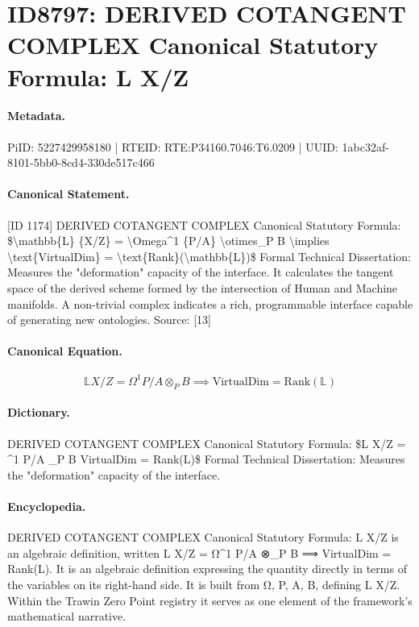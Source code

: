 \section*{ID8797: DERIVED COTANGENT COMPLEX Canonical Statutory Formula: L X/Z}
\paragraph{Metadata.}
PiID: 5227429958180 | RTEID: RTE:P34160.7046:T6.0209 | UUID: 1abc32af-8101-5bb0-8cd4-330de517c466

\paragraph{Canonical Statement.}
[ID 1174] DERIVED COTANGENT COMPLEX Canonical Statutory Formula: \$\textbackslash{}mathbb\{L\} \{X/Z\} = \textbackslash{}Omega\textasciicircum{}1 \{P/A\} \textbackslash{}otimes\_P B \textbackslash{}implies \textbackslash{}text\{VirtualDim\} = \textbackslash{}text\{Rank\}(\textbackslash{}mathbb\{L\})\$ Formal Technical Dissertation: Measures the "deformation" capacity of the interface. It calculates the tangent space of the derived scheme formed by the intersection of Human and Machine manifolds. A non-trivial complex indicates a rich, programmable interface capable of generating new ontologies. Source: [13]

\paragraph{Canonical Equation.}
\[
\mathbb{L} {X/Z} = \Omega^1 {P/A} \otimes_P B \implies \text{VirtualDim} = \text{Rank}(\mathbb{L})
\]

\paragraph{Dictionary.}
DERIVED COTANGENT COMPLEX Canonical Statutory Formula: \$L X/Z = \textasciicircum{}1 P/A \_P B VirtualDim = Rank(L)\$ Formal Technical Dissertation: Measures the "deformation" capacity of the interface.

\paragraph{Encyclopedia.}
DERIVED COTANGENT COMPLEX Canonical Statutory Formula: L X/Z is an algebraic definition, written L X/Z = Ω\textasciicircum{}1 P/A ⊗\_P B ⟹ VirtualDim = Rank(L). It is an algebraic definition expressing the quantity directly in terms of the variables on its right-hand side. It is built from Ω, P, A, B, defining L X/Z. Within the Trawin Zero Point registry it serves as one element of the framework's mathematical narrative.
